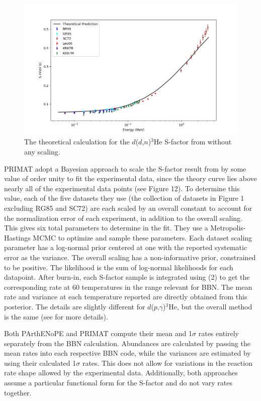 \documentclass[%
 reprint,
superscriptaddress,
nofootinbib,
 amsmath,amssymb,
 aps,
 pra,
]{revtex4-2}
\begin{document}
\begin{figure}
	\centering
	\includegraphics[width=0.6\linewidth]{Figures/ddhe3n_S_theory.png}
	\caption{The theoretical calculation for the $d$($d$,$n$)$^3$He S-factor from \cite{Arai2011} without any scaling. }
\end{figure}

PRIMAT adopt a Bayesian approach to scale the S-factor result from \cite{Arai2011} by some value of order unity to fit the experimental data, since the theory curve lies above nearly all of the experimental data points (see Figure 12). To determine this value, each of the five datasets they use (the collection of datasets in Figure 1 excluding RG85 and SC72) are each scaled by an overall constant to account for the normalization error of each experiment, in addition to the overall scaling. This gives six total parameters to determine in the fit. They use a Metropolis-Hastings MCMC to optimize and sample these parameters. Each dataset scaling parameter has a log-normal prior centered at one with the reported systematic error as the variance. The overall scaling has a non-informative prior, constrained to be positive. The likelihood is the sum of log-normal likelihoods for each datapoint. After burn-in, each S-factor sample is integrated using (2) to get the corresponding rate at 60 temperatures in the range relevant for BBN. The mean rate and variance at each temperature reported are directly obtained from this posterior. The details are slightly different for $d$($p$,$\gamma$)$^3$He, but the overall method is the same (see \cite{Moscoso2021} for more details). 

Both PArthENoPE and PRIMAT compute their mean and 1$\sigma$ rates entirely separately from the BBN calculation. Abundances are calculated by passing the mean rates into each respective BBN code, while the variances are estimated by using their calculated 1$\sigma$ rates. This does not allow for variations in the reaction rate shape allowed by the experimental data. Additionally, both approaches assume a particular functional form for the S-factor and do not vary rates together. 


\end{document}
